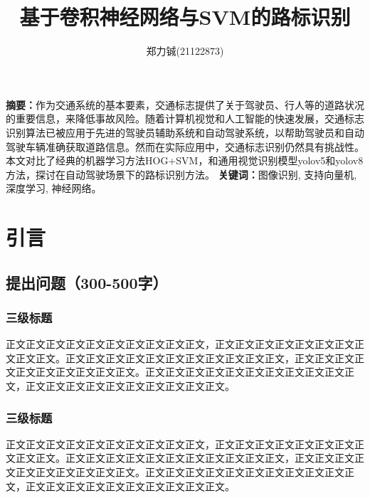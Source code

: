 \documentclass{article}
\title{\textbf{基于卷积神经网络与SVM的路标识别}}
\author{
郑力铖(21122873)
}
\begin{document}
 \songti


\date{}
\maketitle


\begin{center}
    \setlength{\textwidth}{15cm}
    \parbox{\textwidth}{
        \textbf{摘要：}作为交通系统的基本要素，交通标志提供了关于驾驶员、行人等的道路状况的重要信息，来降低事故风险。随着计算机视觉和人工智能的快速发展，交通标志识别算法已被应用于先进的驾驶员辅助系统和自动驾驶系统，以帮助驾驶员和自动驾驶车辆准确获取道路信息。然而在实际应用中，交通标志识别仍然具有挑战性。本文对比了经典的机器学习方法HOG+SVM，和通用视觉识别模型yolov5和yolov8方法，探讨在自动驾驶场景下的路标识别方法。
        \newline
        \textbf{关键词：}图像识别, 支持向量机, 深度学习, 神经网络。
    }
\end{center}

\section{引言}
\subsection{提出问题（300-500字）}
\subsubsection{三级标题}
正文正文正文正文正文正文正文正文正文正文，正文正文正文正文正文正文正文正文正文正文。正文正文正文正文正文正文正文正文正文正文正文，正文正文正文正文正文正文正文正文正文正文。正文正文正文正文正文正文正文正文正文正文正文，正文正文正文正文正文正文正文正文正文正文。

\subsubsection{三级标题}
正文正文正文正文正文正文正文正文正文正文，正文正文正文正文正文正文正文正文正文正文。正文正文正文正文正文正文正文正文正文正文正文，正文正文正文正文正文正文正文正文正文正文。正文正文正文正文正文正文正文正文正文正文正文，正文正文正文正文正文正文正文正文正文正文。
\end{document}
